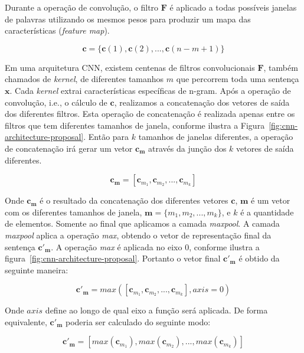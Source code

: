 Durante a operação de convolução, o filtro $\bm{F}$ é aplicado a todas possíveis janelas de palavras utilizando os mesmos pesos para produzir um mapa das características (\textit{feature map}).

\begin{equation}
    \bm{c} = \{ \bm{c}(1), \bm{c}(2), . . ., \bm{c}(n - m + 1) \} 
\end{equation}




Em uma arquitetura CNN, existem centenas de filtros convolucionais $\bm{F}$, também chamados de \textit{kernel}, de diferentes tamanhos $m$ que percorrem toda uma sentença $\bm{x}$. Cada \textit{kernel} extrai características específicas de n-gram. Após a operação de convolução, i.e., o cálculo de $\bm{c}$, realizamos a concatenação dos vetores de saída dos diferentes filtros.
Esta operação de concatenação é realizada apenas entre os filtros que tem diferentes tamanhos de janela, conforme ilustra a Figura~\ref{fig:cnn-architecture-proposal}.
Então para $k$ tamanhos de janelas diferentes, a operação de concatenação irá gerar um vetor $\bm{c}_{\bm{m}}$ através da junção dos $k$ vetores de saída diferentes.

\begin{equation}
    \bm{c}_{\bm{m}} = \left[\bm{c}_{m_1}, \bm{c}_{m_2}, . . ., \bm{c}_{m_{k}}\right]
\end{equation}

Onde $\bm{c}_{\bm{m}}$ é o resultado da concatenação dos diferentes vetores $\bm{c}$, $\bm{m}$ é um vetor com os diferentes tamanhos de janela, $\bm{m} = \{m_1, m_2, . . ., m_{k}\}$, e $k$ é a quantidade de elementos. Somente ao final que aplicamos a camada \textit{maxpool}. A camada \textit{maxpool} aplica a operação \textit{max}, obtendo o vetor de representação final da sentença $\bm{c'}_{\bm{m}}$. A operação \textit{max} é aplicada no eixo $0$, conforme ilustra a figura~\ref{fig:cnn-architecture-proposal}. Portanto o vetor final $\bm{c'}_{\bm{m}}$ é obtido da seguinte maneira:

\begin{equation}
    \bm{c'}_{\bm{m}} = max\left(\left[\bm{c}_{m_1}, \bm{c}_{m_2}, . . ., \bm{c}_{m_k}\right], axis = 0\right)
\end{equation}

Onde $axis$ define ao longo de qual eixo a função será aplicada. De forma equivalente, $\bm{c'}_{\bm{m}}$ poderia ser calculado do seguinte modo:

\begin{equation}\label{eq:final_representation_cnn}
    \bm{c'}_{\bm{m}} = \left[max(\bm{c}_{m_1}), max(\bm{c}_{m_2}), . . ., max(\bm{c}_{m_k})\right]
\end{equation}

